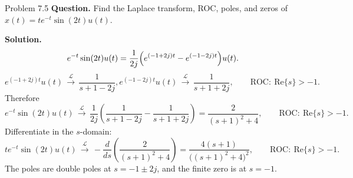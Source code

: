 \documentclass[10pt]{article}
\newcommand{\ROC}{\mathrm{ROC}}
\newcommand{\LT}{\mathcal{L}}
\newcommand{\Prompt}[1]{\textbf{Question.} #1}
\newcommand{\SketchLabel}{\tcblower\textbf{Solution.}}
\newcommand{\Lpair}[2]{#1\,\mathrel{\overset{\LT}{\longrightarrow}}\,#2}
\begin{document}
\begin{examplebox}{Problem 7.5}
  \Prompt{Find the Laplace transform, ROC, poles, and zeros of \(x(t)=t e^{-t}\sin(2t)u(t)\).}

  \medskip
  \SketchLabel{}
  \[
    e^{-t}\sin(2t)u(t)
    =\frac{1}{2j}\Bigl(e^{(-1+2j)t}-e^{(-1-2j)t}\Bigr)u(t).
  \]
  \[
    \Lpair{e^{(-1+2j)t}u(t)}{\frac{1}{s+1-2j}},
    \Lpair{e^{(-1-2j)t}u(t)}{\frac{1}{s+1+2j}},
    \qquad
    \ROC:\ \text{Re}\{s\}>-1.
  \]
  Therefore
  \[
    \Lpair{e^{-t}\sin(2t)u(t)}
    {\frac{1}{2j}\left(\frac{1}{s+1-2j}-\frac{1}{s+1+2j}\right)
    =\frac{2}{(s+1)^2+4}},
    \qquad
    \ROC:\ \text{Re}\{s\}>-1.
  \]
  Differentiate in the \(s\)-domain:
  \[
    \Lpair{t e^{-t}\sin(2t)u(t)}{-\frac{d}{ds}\!\left(\frac{2}{(s+1)^2+4}\right)
    =\frac{4(s+1)}{\bigl((s+1)^2+4\bigr)^2}},
    \qquad
    \ROC:\ \text{Re}\{s\}>-1.
  \]
  The poles are double poles at \(s=-1\pm2j\), and the finite zero is at \(s=-1\).

  \begin{center}
  \end{center}
\end{examplebox}
\end{document}
